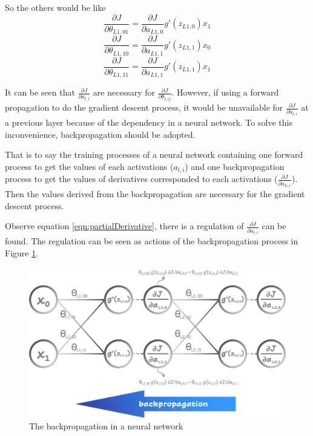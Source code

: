 \begin{itemize}
    So the others would be like
    \begin{equation}
        \frac{\partial J}{\partial \theta_{L1,01}} = \frac{\partial J}{\partial a_{L1,0}} g'(z_{L1,0}) x_1
    \end{equation}
    \begin{equation}
        \frac{\partial J}{\partial \theta_{L1,10}} = \frac{\partial J}{\partial a_{L1,1}} g'(z_{L1,1}) x_0
    \end{equation}
    \begin{equation}
        \frac{\partial J}{\partial \theta_{L1,11}} = \frac{\partial J}{\partial a_{L1,1}} g'(z_{L1,1}) x_1
    \end{equation}
    
    It can be seen that $\frac{\partial{J}}{\partial{a_{l,i}}}$ are necessary for $\frac{\partial{J}}{\partial{\theta_{l,ij}}}$.
    However, if using a forward propagation to do the gradient descent process,
    it would be unavailable for $\frac{\partial{J}}{\partial{a_{l,i}}}$ at a previous layer because of the dependency in a neural network.
    To solve this inconvenience, backpropagation should be adopted.
    
    That is to say the training processes of a neural network containing 
    one forward process to get the values of each activations ($a_{l,i}$) and 
    one backpropagation process to get the values of derivatives corresponded to each activations ($\frac{\partial{J}}{\partial{a_{L,i}}}$).
    Then the values derived from the backpropagation are necessary for the gradient descent process.
    
    Observe equation \ref{eqn:partialDerivative}, there is a regulation of $\frac{\partial{J}}{\partial{a_{l,i}}}$ can be found. 
    The regulation can be seen as actions of the backpropagation process in Figure \ref{fig:backpropagation}.
    
    \begin{figure}[H] \label{fig:backpropagation}
        \centering
        \includegraphics[width=4.8in]{./images/neural_network_back.png}
        \caption{The backpropagation in a neural network}
    \end{figure}
    

\end{itemize}
